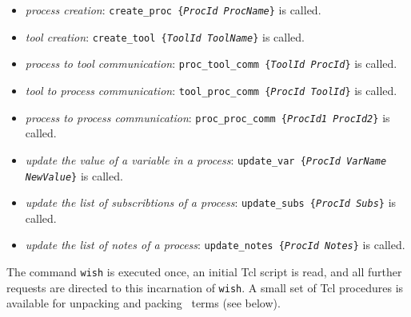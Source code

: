 \begin{itemize}
  \begin{itemize}
  \item \emph{process creation}:
    \texttt{create\_proc \{\emph{ProcId} \emph{ProcName}\}} is
    called.
  \item \emph{tool creation}: \texttt{create\_tool \{\emph{ToolId}
      \emph{ToolName}\}} is called.
  \item \emph{process to tool communication}:
    \texttt{proc\_tool\_comm \{\emph{ToolId} \emph{ProcId}\}} is
    called.
  \item \emph{tool to process communication}:
    \texttt{tool\_proc\_comm \{\emph{ProcId} \emph{ToolId}\}} is
    called.
  \item \emph{process to process communication}:
    \texttt{proc\_proc\_comm \{\emph{ProcId1} \emph{ProcId2}\}} is
    called.
  \item \emph{update the value of a variable in a process}:
    \texttt{update\_var \{\emph{ProcId} \emph{VarName}
      \emph{NewValue}\}} is called.
  \item \emph{update the list of subscribtions of a process}:
    \texttt{update\_subs \{\emph{ProcId} \emph{Subs}\}} is called.
  \item \emph{update the list of notes of a process}:
    \texttt{update\_notes \{\emph{ProcId} \emph{Notes}\}} is called.
  \end{itemize}
\end{itemize}

\noindent The command {\tt wish} is executed once, an initial Tcl script
is read, and all further requests are directed to this incarnation
of {\tt wish}. A small set of Tcl procedures is available for
unpacking and packing \TB\ terms (see below).

